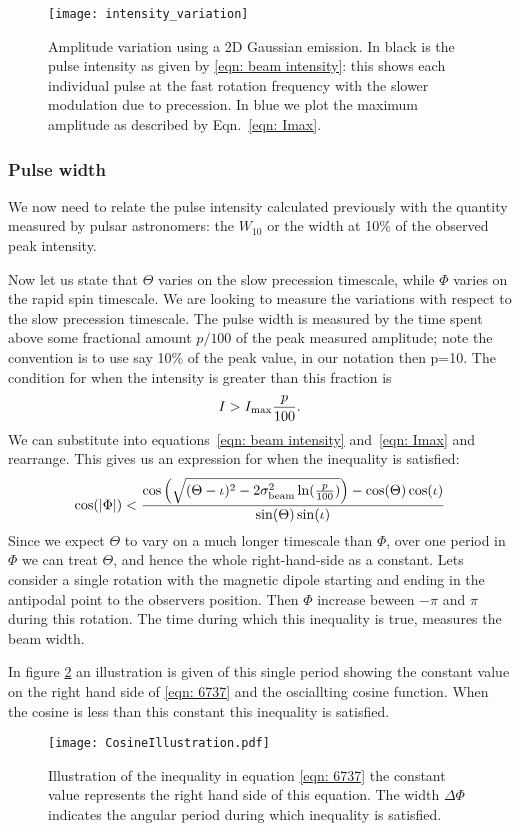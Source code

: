 \documentclass[/home/greg/Thesis/main/main.tex]{subfiles}
\begin{document}
\begin{figure}[htb]
\centering
\texttt{[image: intensity\_variation]}
\caption{Amplitude variation using a 2D Gaussian emission. In black is the pulse
intensity as given by \eqref{eqn: beam intensity}: this shows each individual
pulse at the fast rotation frequency with the slower modulation due to precession.
In blue we plot the maximum amplitude as described by Eqn.~\eqref{eqn: Imax}.}
\label{fig: intensity variation}
\end{figure}



\FloatBarrier
\subsubsection{Pulse width}
We now need to relate the pulse intensity calculated previously with the quantity
measured by pulsar astronomers: the $W_{10}$ or the width at 10\% of the observed peak
intensity.

Now let us state that $\Theta$ varies on the slow
precession timescale, while $\Phi$ varies on the rapid spin timescale. We are
looking to measure the variations with respect to the slow precession timescale.
The pulse width is measured by the time spent above some fractional amount $p/100$
of the peak measured amplitude; note the convention is to use say 10\% of the peak
value, in our notation then p=10. The condition for when the intensity is greater
than this fraction is
\begin{align}
I > I_{\textrm{max}} \frac{p}{100}.
\end{align}
We can substitute into equations~\eqref{eqn: beam intensity} and~\eqref{eqn: Imax}
and rearrange. This gives us an expression for when the inequality is satisfied:
\begin{equation}
\cos(|\Phi|) < \frac{\cos\left(\sqrt{
    (\Theta - \iota)^{2}-2\sigma_{\textrm{beam}}^{2} \ln(\frac{p}{100})}\right)-\cos(\Theta)\cos(\iota)}
    {\sin(\Theta)\sin(\iota)}
\label{eqn: 6737}
\end{equation}
Since we expect $\Theta$ to vary on a much longer timescale than $\Phi$, over
one period in $\Phi$ we can treat $\Theta$, and hence the whole right-hand-side
as a constant. Lets consider a single rotation with the magnetic dipole
starting and ending in the antipodal point to the observers position. Then
$\Phi$ increase beween $-\pi$ and $\pi$ during this rotation. The
time during which this inequality is true, measures the beam width.

In figure \ref{fig: CosineIllustration} an illustration is given of this single
period showing the constant value on the right hand side of \eqref{eqn: 6737} and
the osciallting cosine function. When the cosine is less than this constant
this inequality is satisfied.
\begin{figure}[ht]
\centering
\texttt{[image: CosineIllustration.pdf]}
\caption{Illustration of the inequality in equation \eqref{eqn: 6737} the constant
         value represents the right hand side of this equation. The
         width $\Delta\Phi$ indicates the angular period during which inequality
         is satisfied.}
\label{fig: CosineIllustration}
\end{figure}
\end{document}
